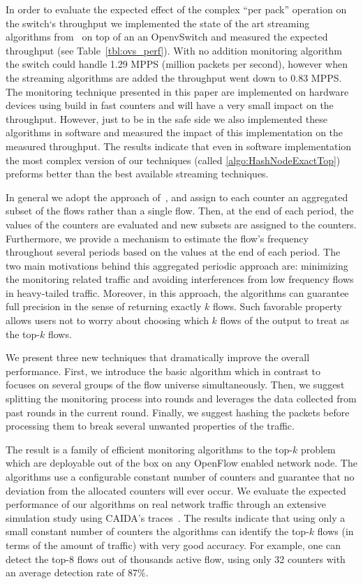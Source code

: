 In order to evaluate the expected effect of the complex ``per pack'' operation on the switch`s throughput we implemented the state of the art streaming algorithms from~\cite{Ben-Basat2017} on top of an an OpenvSwitch and measured the expected throughput (see Table~\ref{tbl:ovs_perf}).  With no addition monitoring algorithm the switch could handle 1.29 MPPS (million packets per second), however when the streaming algorithms are added the throughput went down to 0.83 MPPS.  The monitoring technique presented in this paper are implemented on hardware devices using build in fast counters and will have a very small impact on the throughput.  However, just to be in the safe side we also implemented these algorithms in software and measured the impact of this implementation on the measured throughput. The results indicate that even in software implementation the most complex version of our techniques (called \ref{algo:HashNodeExactTop}) preforms better than the best available streaming techniques. 

In general we adopt the approach of~\cite{Moraney2016}, and assign to each counter an aggregated subset of the flows rather than a single flow. Then, at the end of each period, the values of the counters are evaluated and new subsets are assigned to the counters. Furthermore, we provide a mechanism to estimate the flow's frequency throughout several periods based on the values at the end of each period. The two main motivations behind this aggregated periodic approach are: minimizing the monitoring related traffic and avoiding interferences from low frequency flows in heavy-tailed traffic. Moreover, in this approach, the algorithms can guarantee full precision in the sense of returning exactly $k$ flows. Such favorable property allows users not to worry about choosing which $k$ flows of the output to treat as the top-$k$ flows.

We present three new techniques that dramatically improve the overall performance. 
First, we introduce the basic algorithm which in contrast to~\cite{Moraney2016} focuses on several groups of the flow universe simultaneously.
Then, we suggest splitting the monitoring process into rounds and leverages the data collected from past rounds in the current round.
Finally, we suggest hashing the packets before processing them to break several unwanted properties of the traffic.

The result is a family of efficient monitoring algorithms to the top-$k$ problem which are deployable out of the box on any OpenFlow enabled network node. The algorithms use a configurable constant number of counters and guarantee that no deviation from the allocated counters will ever occur.  We evaluate the expected performance of our algorithms on real network traffic through an extensive simulation study using CAIDA’s traces~\cite{CAIDA14,CAIDA15,CAIDA16}.  The results indicate that using only a small constant number of counters the algorithms can identify the top-$k$ flows (in terms of the amount of traffic) with very good accuracy.  For example, one can detect the top-8 flows out of thousands active flow, using only 32 counters with an average detection rate of 87\%. 

